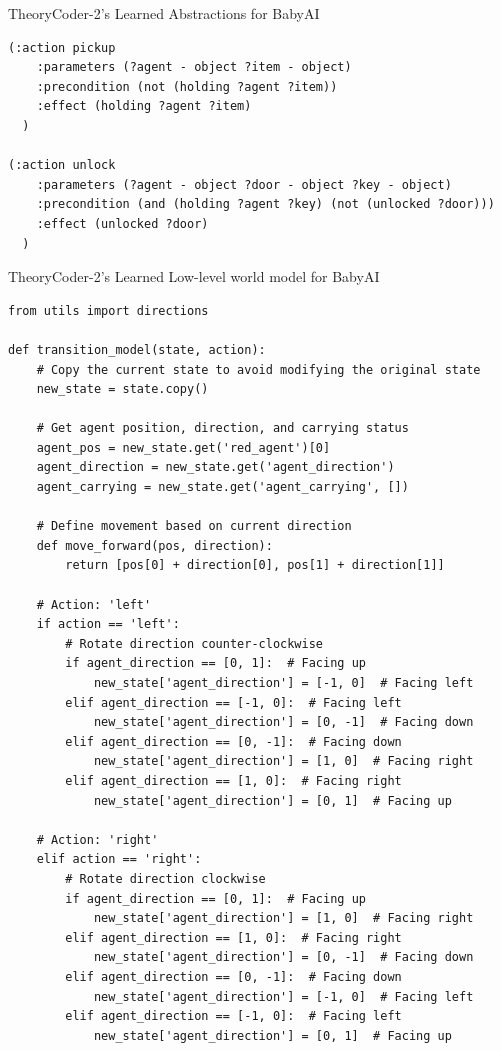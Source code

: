 \documentclass{article}
\theoremstyle{plain}
\theoremstyle{definition}
\theoremstyle{remark}
\begin{document}
\begin{mybox}[boxrule=0pt, parbox=false, opacityframe=1, colframe=black, label=box:tc2_babyai_abstractions]{TheoryCoder-2's Learned Abstractions for BabyAI}
\begin{lstlisting}[basicstyle=\ttfamily\small, breaklines=true]
(:action pickup
    :parameters (?agent - object ?item - object)
    :precondition (not (holding ?agent ?item))
    :effect (holding ?agent ?item)
  )

(:action unlock
    :parameters (?agent - object ?door - object ?key - object)
    :precondition (and (holding ?agent ?key) (not (unlocked ?door)))
    :effect (unlocked ?door)
  )
\end{lstlisting}

\end{mybox}

\begin{mybox}[boxrule=0pt, parbox=false, opacityframe=1, colframe=black, label=box:tc2_babyai_lowlevel_wm]{TheoryCoder-2's Learned Low-level world model for BabyAI}
\begin{lstlisting}[basicstyle=\ttfamily\small, breaklines=true]
from utils import directions

def transition_model(state, action):
    # Copy the current state to avoid modifying the original state
    new_state = state.copy()
    
    # Get agent position, direction, and carrying status
    agent_pos = new_state.get('red_agent')[0]
    agent_direction = new_state.get('agent_direction')
    agent_carrying = new_state.get('agent_carrying', [])
    
    # Define movement based on current direction
    def move_forward(pos, direction):
        return [pos[0] + direction[0], pos[1] + direction[1]]
    
    # Action: 'left'
    if action == 'left':
        # Rotate direction counter-clockwise
        if agent_direction == [0, 1]:  # Facing up
            new_state['agent_direction'] = [-1, 0]  # Facing left
        elif agent_direction == [-1, 0]:  # Facing left
            new_state['agent_direction'] = [0, -1]  # Facing down
        elif agent_direction == [0, -1]:  # Facing down
            new_state['agent_direction'] = [1, 0]  # Facing right
        elif agent_direction == [1, 0]:  # Facing right
            new_state['agent_direction'] = [0, 1]  # Facing up
    
    # Action: 'right'
    elif action == 'right':
        # Rotate direction clockwise
        if agent_direction == [0, 1]:  # Facing up
            new_state['agent_direction'] = [1, 0]  # Facing right
        elif agent_direction == [1, 0]:  # Facing right
            new_state['agent_direction'] = [0, -1]  # Facing down
        elif agent_direction == [0, -1]:  # Facing down
            new_state['agent_direction'] = [-1, 0]  # Facing left
        elif agent_direction == [-1, 0]:  # Facing left
            new_state['agent_direction'] = [0, 1]  # Facing up
    

\end{lstlisting}
\end{mybox}
\end{document}
